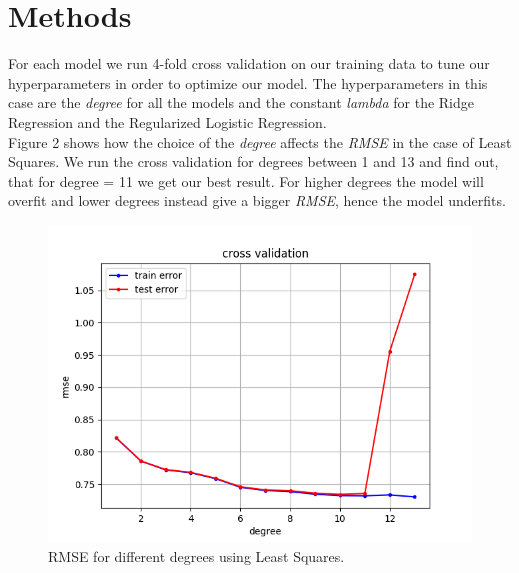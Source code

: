 \documentclass[10pt,conference,compsocconf]{IEEEtran}
\begin{document}
\section{Methods}
\label{sec:tips-writing}


For each model we run 4-fold cross validation on our training data to tune our hyperparameters in order to optimize our model. The hyperparameters in this case are the \textit{degree} for all the models and the constant \textit{lambda} for the Ridge Regression and the Regularized Logistic Regression.
\\
Figure 2 shows how the choice of the \textit{degree} affects the \textit{RMSE} in the case of Least Squares. We run the cross validation for degrees between 1 and 13 and find out, that for degree = 11 we get our best result. For higher degrees the model will overfit and lower degrees instead give a bigger \textit{RMSE}, hence the model underfits.

\begin{figure}[htbp]
  \centering
  \includegraphics[width=\columnwidth]{cross_validation_leastsquares.png}
  \caption{RMSE for different degrees using Least Squares.}
  \vspace{-3mm}
  \label{fig:crossvalidationleastsquares}
\end{figure}
\end{document}
